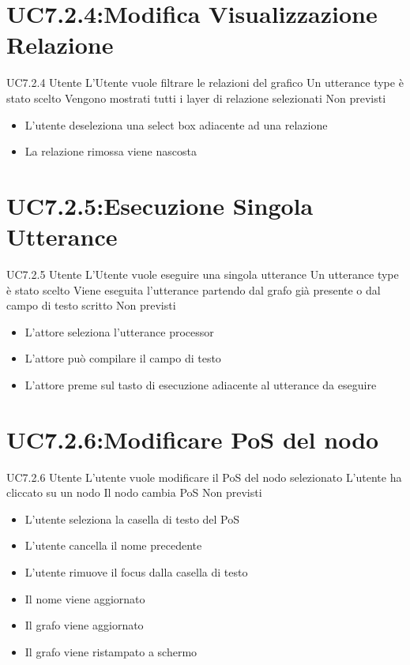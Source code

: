 \documentclass[../AnalisideiRequisiti.tex]{subfiles}
\begin{document}
\section{UC7.2.4:Modifica Visualizzazione Relazione}
\UserCase
{UC7.2.4}
{Utente}
{}
{L'Utente vuole filtrare le relazioni del grafico}
{Un utterance type è stato scelto }
{Vengono mostrati tutti i layer di relazione selezionati}
{Non previsti}
{\begin{itemize}
		\item{} L'utente deseleziona una select box adiacente ad una relazione
		\item{} La relazione rimossa viene nascosta
\end{itemize}
}
\section{UC7.2.5:Esecuzione Singola Utterance}
\UserCase
{UC7.2.5}
{Utente}
{}
{L'Utente vuole eseguire una singola utterance}
{Un utterance type è stato scelto  }
{Viene eseguita l'utterance partendo dal grafo già presente o dal campo di testo scritto}
{Non previsti}
{\begin{itemize}
				\item{} L'attore seleziona l'utterance processor
		\item{} L'attore può compilare il campo di testo
		\item{} L'attore preme sul tasto di esecuzione adiacente al utterance da eseguire 
	\end{itemize}
}

\section{UC7.2.6:Modificare PoS del nodo}
\UserCase
{UC7.2.6}
{Utente}
{}
{L'utente vuole modificare il PoS del nodo selezionato}
{L'utente ha cliccato su un nodo}
{Il nodo cambia PoS}
{Non previsti}
{\begin{itemize}
		\item{} L'utente seleziona la casella di testo del PoS
		\item{} L'utente cancella il nome precedente
		\item{} L'utente rimuove il focus dalla casella di testo
		\item{} Il nome viene aggiornato
		\item{} Il grafo viene aggiornato 
		\item{} Il grafo viene ristampato a schermo 
\end{itemize}}
\end{document}
